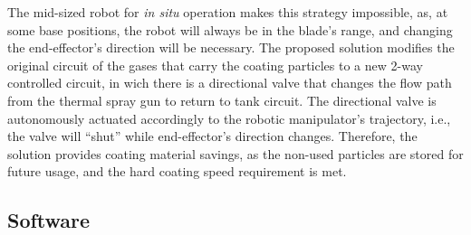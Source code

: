 The mid-sized robot for \textit{in situ} operation makes this strategy
impossible, as, at some base positions, the robot will always be in the blade's
range, and changing the end-effector's direction will be necessary. The proposed
solution modifies the original circuit of the gases that carry the coating
particles to a new 2-way controlled circuit, in wich there is a directional
valve that changes the flow path from the thermal spray gun to return to tank
circuit. %
The directional valve is autonomously actuated accordingly to the robotic
manipulator's trajectory, i.e., the valve will ``shut'' while end-effector's
direction changes. Therefore, the solution provides coating material savings,
as the non-used particles are stored for future usage, and the hard coating
speed requirement is met.


\subsection{Software}